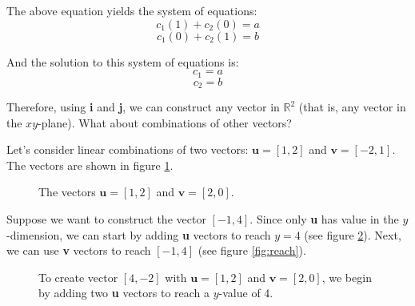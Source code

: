 The above equation yields the system of equations:
$$c_1 \left( 1 \right) + c_2 \left( 0 \right) = a$$
$$c_1 \left( 0 \right) + c_2 \left( 1 \right) = b$$

And the solution to this system of equations is:
$$c_1 = a$$
$$c_2 = b$$

Therefore, using \textbf{i} and \textbf{j}, we can construct any vector in 
$\mathbb{R}^2$ (that is, any vector in the $xy$-plane). What about combinations 
of other vectors?

Let's consider linear combinations of two vectors: $\textbf{u} = \left[ 1, 2 
\right]$ and $\textbf{v} = \left[ -2, 1 \right]$. The vectors are shown in 
figure \ref{fig:u_and_v}. 

\begin{figure}[htbp]
    \centering
    \caption{The vectors $\textbf{u} = \left[ 1, 2 \right]$ and $\textbf{v} = 
    \left[ 2, 0 \right]$.}
    \label{fig:u_and_v}
\end{figure}

Suppose we want to construct the vector $\left[ -1, 4 \right]$. Since only 
\textbf{u} has value in the $y$-dimension, we can start by adding \textbf{u} 
vectors to reach $y = 4$ (see figure \ref{fig:just_u}). Next, we can use 
\textbf{v} vectors to reach $\left[ -1, 4 \right]$ (see figure \ref{fig:reach}). 

\begin{figure}[htbp]
    \centering
    \caption{To create vector $\left[ 4, -2 \right]$ with $\textbf{u} = \left[
    1, 2 \right]$ and $\textbf{v} = \left[2, 0 \right]$, we begin by adding two 
    \textbf{u} vectors to reach a $y$-value of 4.}
    \label{fig:just_u}
\end{figure}

